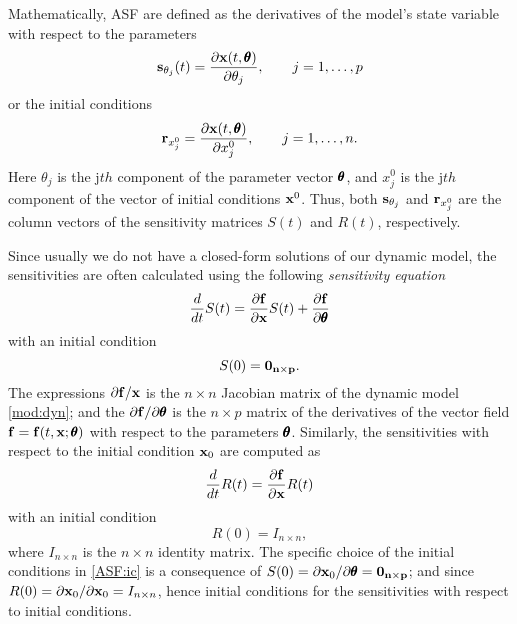 \documentclass[a4paper, 12pt]{article}
\begin{document}
Mathematically, ASF are defined as the derivatives of the model's state variable with respect to the parameters
\begin{equation}
\mathbf{s}_{\theta_j} (t) = \frac{\partial \mathbf{x} (t,{\pmb{\theta}})}{\partial \theta_j},\qquad j=1,\ldots, p
\end{equation}
or the initial conditions
\begin{equation}
\mathbf{r}_{x^0_j} = \frac{\partial \mathbf{x} (t,{\pmb{\theta}})}{\partial x^0_j},\qquad j = 1,\ldots, n.
\end{equation}
Here $\theta_j$ is the j$th$ component of the parameter vector ${\pmb{\theta}}$, and  $x^0_j$ is the j$th$ component of the vector of initial conditions $\mathbf{x}^0$. Thus, both $\mathbf{s}_{\theta_j}$ and $\mathbf{r}_{x^0_j}$ are the column vectors of the sensitivity matrices $S(t)$ and $R(t)$, respectively.

\smallskip

Since usually we do not have a closed-form solutions of our dynamic model, the sensitivities are often calculated using the following \emph{sensitivity equation}
\begin{equation}\label{ASF:eq}
\frac{d}{dt} S(t) = \frac{\partial \mathbf{f}}{\partial \mathbf{x}} S(t) + \frac{\partial \mathbf{f}}{\partial {\pmb{\theta}}}
\end{equation}
with an initial condition
\begin{equation}\label{ASF:ic}
S(0) = \bf0_{n\times p}.
\end{equation}
The expressions $\partial \mathbf{f}/\mathbf{x}$ is the  $n\times n$ Jacobian matrix of the dynamic model \eqref{mod:dyn};  and the $\partial \mathbf{f}/\partial {\pmb{\theta}}$ is the $n\times p$ matrix of the derivatives of the vector field $\mathbf{f} = \mathbf{f}(t,\mathbf{x};{\pmb{\theta}})$ with respect to the parameters ${\pmb{\theta}}$. Similarly, the sensitivities with respect to the initial condition $\mathbf{x}_0$ are computed as
\begin{equation}\label{ASF:r}
\frac{d}{dt} R(t) = \frac{\partial \mathbf{f}}{\partial \mathbf{x}} R(t) 
\end{equation}
with an initial condition
\begin{equation}\label{ASF:rx0}
R(0) = I_{n\times n},
\end{equation}
where $I_{n\times n}$ is the $n\times n$ identity matrix. The specific choice of the initial conditions in \eqref{ASF:ic} is a consequence of  $S(0) = \partial\mathbf{x}_0/\partial {\pmb{\theta}} = \bf0_{n\times p}$; and since $R(0) = \partial\mathbf{x}_0/\partial \mathbf{x}_0 = I_{n\times n}$, hence initial conditions for the sensitivities with respect to initial conditions.

\smallskip
\end{document}
